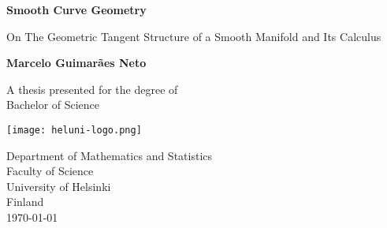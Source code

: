 \begin{titlepage}
    \begin{center}
        \vspace*{1cm}
            
        \Huge
        \textbf{Smooth Curve Geometry}
            
        \vspace{0.5cm}
        \LARGE
        On The Geometric Tangent Structure of a Smooth Manifold and Its Calculus
            
        \vspace{1.5cm}
            
        \textbf{Marcelo Guimarães Neto}
            
        \vfill
            
        A thesis presented for the degree of\\
        Bachelor of Science
            
        \vspace{0.8cm}
            
        \texttt{[image: heluni-logo.png]}
        
        \vspace{0.8cm}
            
        \Large
        Department of Mathematics and Statistics\\
        Faculty of Science\\
        University of Helsinki\\
        Finland\\
        \today
            
    \end{center}
\end{titlepage}

